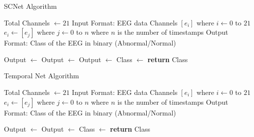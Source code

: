 \documentclass{article}[12pt]
\begin{document}
    \begin{algorithm}
    \caption{SCNet Algorithm}
        \begin{algorithmic}[1]
         
            \State Total Channels $\gets 21$
            \State Input Format: EEG data Channels $[e_i]$ where $i \gets 0$ to $21$
            \State $e_i \gets [e_j]$ where $j \gets 0$ to $n$ where $n$ is the number of timestamps
            \State 
            \State Output Format: Class of the EEG in binary (Abnormal/Normal)
            \State

            \State Output $\gets$  
            \State Output $\gets$ 
            \State Output $\gets$ 
            \State Class $\gets$ 
            \State \textbf{return} Class
        \EndProcedure
        \end{algorithmic}
    \end{algorithm}

    \begin{algorithm}
    \caption{Temporal Net Algorithm}
        \begin{algorithmic}[1]
         
            \State Total Channels $\gets 21$
            \State Input Format: EEG data Channels $[e_i]$ where $i \gets 0$ to $21$
            \State $e_i \gets [e_j]$ where $j \gets 0$ to $n$ where $n$ is the number of timestamps
            \State 
            \State Output Format: Class of the EEG in binary (Abnormal/Normal)
            \State

            \State Output $\gets$  
            \State Output $\gets$ 
            \State Class $\gets$ 
            \State \textbf{return} Class
        \EndProcedure
        \end{algorithmic}
        
    \end{algorithm}
\end{document}
